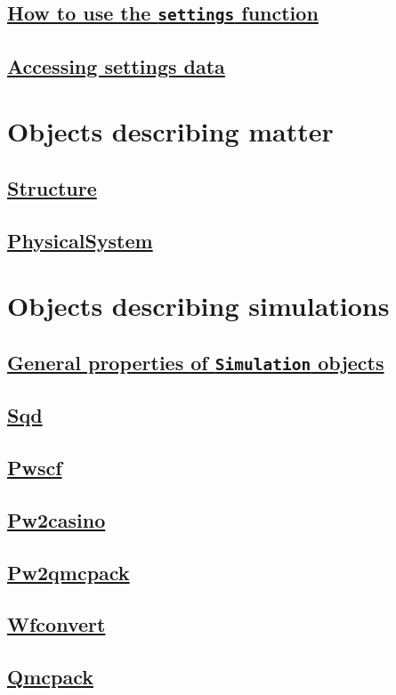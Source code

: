 \documentclass[oneside,11pt]{memoir}
\numberwithin{equation}{section}
\newcommand{\bu}[1]{\textbf{\underline{#1}}}
\begin{document}
\subsection{\bu{How to use the \texttt{settings} function}}
\subsection{\bu{Accessing settings data}}


\section{Objects describing matter}
\subsection{\bu{Structure}}
\subsection{\bu{PhysicalSystem}}


\section{Objects describing simulations}
\subsection{\bu{General properties of \texttt{Simulation} objects}}
\subsection{\bu{Sqd}}
\subsection{\bu{Pwscf}}
\subsection{\bu{Pw2casino}}
\subsection{\bu{Pw2qmcpack}}
\subsection{\bu{Wfconvert}}
\subsection{\bu{Qmcpack}}
\end{document}
